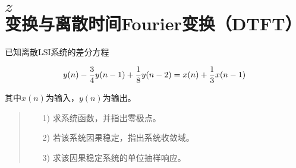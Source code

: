 \documentclass[cn, hazy, blue, normal, 14pt]{elegantnote}
\begin{document}
\section{$z$变换与离散时间Fourier变换（DTFT）}

\begin{exercise}

已知离散LSI系统的差分方程

\begin{equation}
\notag
    y(n)-\frac{3}{4}y(n-1)+\frac{1}{8}y(n-2)=x(n)+\frac{1}{3}x(n-1)
\end{equation}

其中$x(n)$为输入，$y(n)$为输出。

\begin{quote}
\begin{itemize}
    \item[1)] 求系统函数，并指出零极点。
    \item[2)] 若该系统因果稳定，指出系统收敛域。
    \item[3)] 求该因果稳定系统的单位抽样响应。 
\end{itemize}
\end{quote}

\end{exercise}
\end{document}
